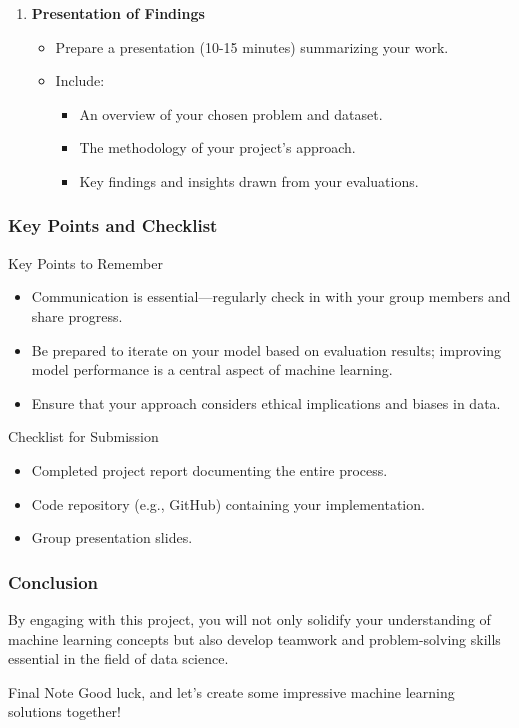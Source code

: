 \documentclass[aspectratio=169]{beamer}
\begin{document}
\begin{frame}[fragile]
\begin{enumerate}
    \item \textbf{Presentation of Findings}
    \begin{itemize}
      \item Prepare a presentation (10-15 minutes) summarizing your work.
      \item Include:
      \begin{itemize}
        \item An overview of your chosen problem and dataset.
        \item The methodology of your project's approach.
        \item Key findings and insights drawn from your evaluations.
      \end{itemize}
    \end{itemize}
  \end{enumerate}
\end{frame}

\begin{frame}[fragile]
  \frametitle{Key Points and Checklist}
  \begin{block}{Key Points to Remember}
    \begin{itemize}
      \item Communication is essential—regularly check in with your group members and share progress.
      \item Be prepared to iterate on your model based on evaluation results; improving model performance is a central aspect of machine learning.
      \item Ensure that your approach considers ethical implications and biases in data.
    \end{itemize}
  \end{block}

  \begin{block}{Checklist for Submission}
    \begin{itemize}
      \item Completed project report documenting the entire process.
      \item Code repository (e.g., GitHub) containing your implementation.
      \item Group presentation slides.
    \end{itemize}
  \end{block}
\end{frame}

\begin{frame}[fragile]
  \frametitle{Conclusion}
  By engaging with this project, you will not only solidify your understanding of machine learning concepts but also develop teamwork and problem-solving skills essential in the field of data science.

  \vspace{0.5cm}
  \begin{block}{Final Note}
    Good luck, and let’s create some impressive machine learning solutions together!
  \end{block}
\end{frame}
\end{document}
